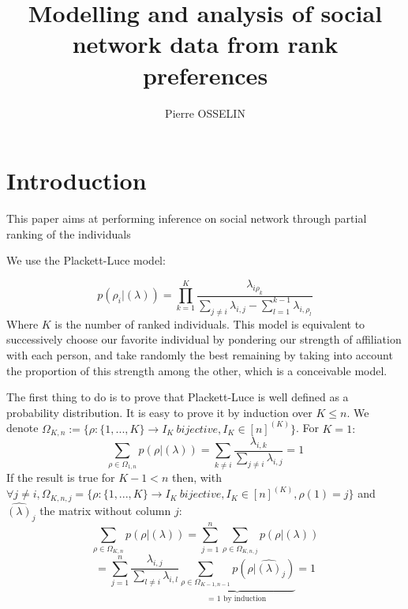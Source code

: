 \documentclass[12pt]{ociamthesis}  %
\title{Modelling and analysis of social network data from rank preferences     %
	}   %
\author{Pierre OSSELIN}             %
\begin{document}
	
	\maketitle                  %
	\tableofcontents
	
	
	\chapter{Introduction}
	
	This paper aims at performing inference on social network through partial ranking of the individuals
	
	We use the Plackett-Luce model: 
	
	\begin{equation}
	p(\rho_{i} | (\lambda)) = \prod_{k = 1}^{K}\frac{\lambda_{i\rho_{k}}}{\sum_{j \neq i}\lambda_{i,j} - \sum_{l = 1}^{k - 1}\lambda_{i,\rho_{l}}}
	\end{equation}
	Where $K$ is the number of ranked individuals. This model is equivalent to successively choose our favorite individual by pondering our strength of affiliation with each person, and take randomly the best remaining by taking into account the proportion of this strength among the other, which is a conceivable model.
	
	The first thing to do is to prove that Plackett-Luce is well defined as a probability distribution. It is easy to prove it by induction over $K \leq n$. \newline
	We denote $\Omega_{K,n} := \{ \rho : \{1,...,K\} \rightarrow I_{K} \ bijective, I_{K} \in [n]^{(K)}  \}$. For $K = 1 :$
	\begin{equation}
	\sum_{\rho \in \Omega_{1,n} }p(\rho | (\lambda)) = \sum_{k \neq i}\frac{\lambda_{i,k}}{\sum_{j \neq i}\lambda_{i,j}} = 1
	\end{equation}
	If the result is true for $K - 1 < n$ then, with \newline 
	$\forall j \neq i, \Omega_{K,n,j} = \{ \rho : \{1,...,K\} \rightarrow I_{K} \ bijective, I_{K} \in [n]^{(K)}, \rho(1) = j\}$ and $\hat{(\lambda)}_{j}$ the matrix without column $j$:
	\begin{equation}
	\sum_{\rho \in \Omega_{K,n} }p(\rho | (\lambda)) = \sum_{j = 1}^{n} \sum_{\rho \in \Omega_{K,n,j}}p(\rho | (\lambda))
	\end{equation}
	\begin{equation}
	= \sum_{j = 1}^{n} \frac{\lambda_{i,j}}{\sum_{l \neq i}\lambda_{i,l}} \underbrace{\sum_{\rho \in \Omega_{K-1,n-1}}p(\rho | \hat{(\lambda)}_{j})}_\text{= 1 by induction} = 1
	\end{equation}
	
\end{document}
